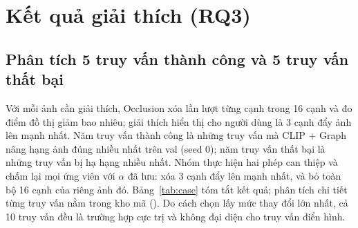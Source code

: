 \section{Kết quả giải thích (RQ3)}
\label{sec:xai}

\subsection{Phân tích 5 truy vấn thành công và 5 truy vấn thất bại}
Với mỗi ảnh cần giải thích, Occlusion xóa lần lượt từng cạnh trong 16 cạnh và đo điểm đồ thị giảm bao nhiêu; giải thích hiển thị cho người dùng là 3 cạnh đẩy ảnh lên mạnh nhất. Năm truy vấn thành công là những truy vấn mà CLIP + Graph nâng hạng ảnh đúng nhiều nhất trên val (seed 0); năm truy vấn thất bại là những truy vấn bị hạ hạng nhiều nhất. Nhóm thực hiện hai phép can thiệp và chấm lại mọi ứng viên với $\alpha$ đã lưu: xóa 3 cạnh đẩy lên mạnh nhất, và bỏ toàn bộ 16 cạnh của riêng ảnh đó. Bảng~\ref{tab:case} tóm tắt kết quả; phân tích chi tiết từng truy vấn nằm trong kho mã (). Do cách chọn lấy mức thay đổi lớn nhất, cả 10 truy vấn đều là trường hợp cực trị và không đại diện cho truy vấn điển hình.

